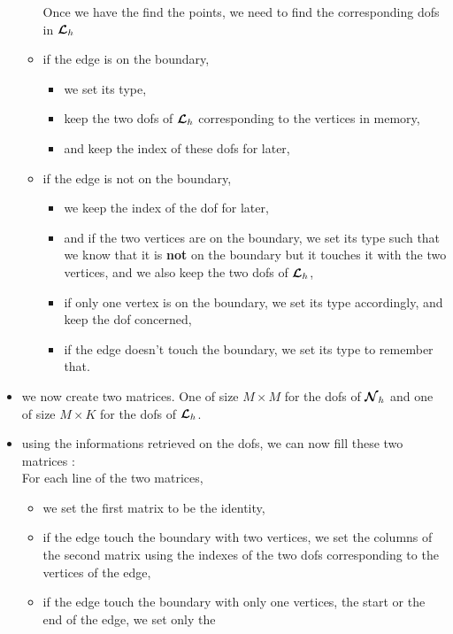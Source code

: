 \begin{itemize}
\begin{itemize}
    
    Once we have the find the points, we need to find the corresponding dofs in ${\bm{\mathcal{L}}}_h$
    
  \item
    if the edge is on the boundary,
    \begin{itemize}
    \item
      we set its type,
    \item
      keep the two dofs of ${\bm{\mathcal{L}}}_h$ corresponding to the vertices in memory,
    \item
      and keep the index of these dofs for later,
    \end{itemize}
  \item
    if the edge is not on the boundary,
    \begin{itemize}
    \item
      we keep the index of the dof for later,
    \item
      and if the two vertices are on the boundary, we set its type such that we
      know that it is {\bf not} on the boundary but it touches it with the two
      vertices, and we also keep the two dofs of ${\bm{\mathcal{L}}}_h$,
    \item
      if only one vertex is on the boundary, we set its type accordingly, and
      keep the dof concerned,
    \item
      if the edge doesn't touch the boundary, we set its type to remember that.
    \end{itemize}
  \end{itemize}
\item
  we now create two matrices. One of size $M\times M$ for the dofs of ${\bm{\mathcal{N}}}_h$ and one of size $M\times K$ for the dofs of ${\bm{\mathcal{L}}}_h$.
  
\item
  using the informations retrieved on the dofs, we can now fill these two
  matrices :\\
  For each line of the two matrices,
  \begin{itemize}
  \item
    we set the first matrix to be the identity,
  \item
    if the edge touch the boundary with two vertices, we set the columns of
    the second matrix using the indexes of the two dofs corresponding to the
    vertices of the edge,
  \item
    if the edge touch the boundary with only one vertices, the start or the end of the edge, we set only the

\end{itemize}
\end{itemize}
